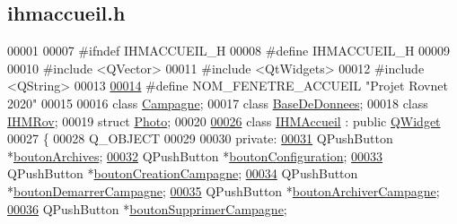 \hypertarget{ihmaccueil_8h_source}{}\subsection{ihmaccueil.\+h}
\label{ihmaccueil_8h_source}

\begin{DoxyCode}
00001 
00007 \textcolor{preprocessor}{#ifndef IHMACCUEIL\_H}
00008 \textcolor{preprocessor}{#define IHMACCUEIL\_H}
00009 
00010 \textcolor{preprocessor}{#include <QVector>}
00011 \textcolor{preprocessor}{#include <QtWidgets>}
00012 \textcolor{preprocessor}{#include <QString>}
00013 
\hyperlink{ihmaccueil_8h_a26ff7f60eb1bfd16fed17fed2d65c865}{00014} \textcolor{preprocessor}{#define NOM\_FENETRE\_ACCUEIL "Projet Rovnet 2020"}
00015 
00016 \textcolor{keyword}{class }\hyperlink{class_campagne}{Campagne};
00017 \textcolor{keyword}{class }\hyperlink{class_base_de_donnees}{BaseDeDonnees};
00018 \textcolor{keyword}{class }\hyperlink{class_i_h_m_rov}{IHMRov};
00019 \textcolor{keyword}{struct }\hyperlink{struct_photo}{Photo};
00020 
\hyperlink{class_i_h_m_accueil}{00026} \textcolor{keyword}{class }\hyperlink{class_i_h_m_accueil}{IHMAccueil} : \textcolor{keyword}{public} \hyperlink{class_q_widget}{QWidget}
00027 \{
00028     Q\_OBJECT
00029 
00030 \textcolor{keyword}{private}:
\hyperlink{class_i_h_m_accueil_a313a8c52763aa2978010db77ec6673ac}{00031}     QPushButton *\hyperlink{class_i_h_m_accueil_a313a8c52763aa2978010db77ec6673ac}{boutonArchives};            
\hyperlink{class_i_h_m_accueil_a8b8ed7d11ab66e3c6895b3c6129dc9c8}{00032}     QPushButton *\hyperlink{class_i_h_m_accueil_a8b8ed7d11ab66e3c6895b3c6129dc9c8}{boutonConfiguration};       
\hyperlink{class_i_h_m_accueil_a4186b4ef6a9c63f5b3c6431626ff3268}{00033}     QPushButton *\hyperlink{class_i_h_m_accueil_a4186b4ef6a9c63f5b3c6431626ff3268}{boutonCreationCampagne};    
\hyperlink{class_i_h_m_accueil_a9fd8ab3abc0c1e6addd70c8d7c46fb65}{00034}     QPushButton *\hyperlink{class_i_h_m_accueil_a9fd8ab3abc0c1e6addd70c8d7c46fb65}{boutonDemarrerCampagne};    
\hyperlink{class_i_h_m_accueil_a96d64cf254c0645eb45c317858b0a0f3}{00035}     QPushButton *\hyperlink{class_i_h_m_accueil_a96d64cf254c0645eb45c317858b0a0f3}{boutonArchiverCampagne};    
\hyperlink{class_i_h_m_accueil_afb409fb4395372f35f9f8699fcb4c89b}{00036}     QPushButton *\hyperlink{class_i_h_m_accueil_afb409fb4395372f35f9f8699fcb4c89b}{boutonSupprimerCampagne};   

\end{DoxyCode}
